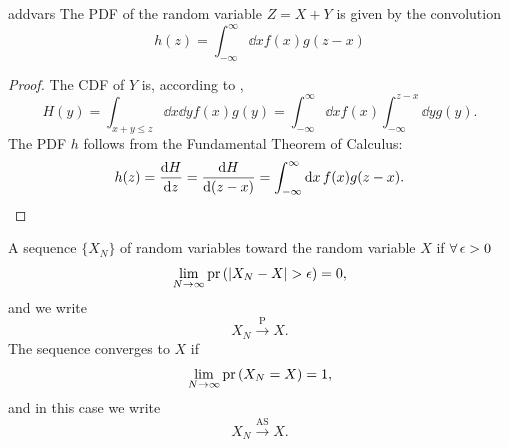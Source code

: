 \begin{proposition}{}{addvars}
  The PDF of the random variable $Z=X+Y$ is given by the convolution
  \begin{equation*}
    h(z)=\int_{-\infty}^\infty\dd{x}f(x)g(z-x)
  \end{equation*}
  \begin{proof}
    The CDF of $Y$ is, according to ,
    \begin{equation*}
      H(y)=\int_{x+y\leq z}\dd{x}\dd{y}f(x)g(y)
          =\int_{-\infty}^\infty\dd{x}f(x)\int_{-\infty}^{z-x}
            \dd{y}g(y).
    \end{equation*}
    The PDF $h$ follows from the Fundamental Theorem of Calculus:
    \begin{equation*}
      h(z)=\dv{H}{z}=\dv{H}{(z-x)}
          =\int_{-\infty}^\infty\dd{x}f(x)g(z-x).
    \end{equation*}
  \end{proof}
\end{proposition}

A sequence $\{X_N\}$ of random variables 
toward the random variable $X$ if $\operatorname{\forall}\epsilon>0$ 
\begin{equation}
  \lim_{N\to\infty}\pr{|X_N-X|>\epsilon}=0,
\end{equation}
and we write
\begin{equation}
  X_N\xrightarrow{\text{P}}X.
\end{equation}
The sequence converges to $X$ 
 if
\begin{equation}
  \lim_{N\to\infty}\pr{X_N=X}=1,
\end{equation}
and in this case we write
\begin{equation}
  X_N\xrightarrow{\text{AS}}X.
\end{equation}

